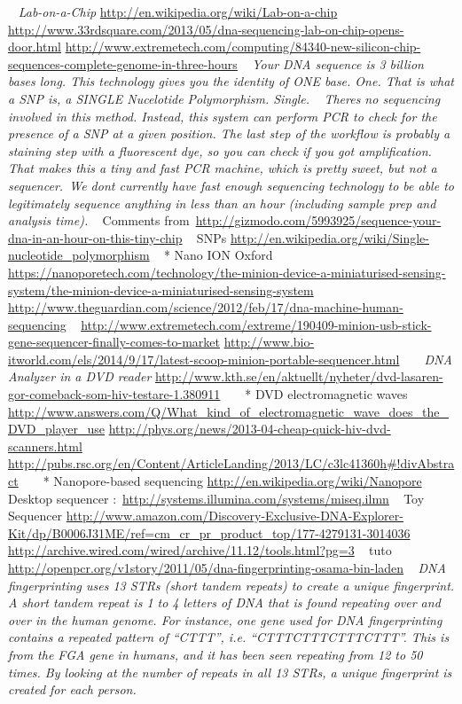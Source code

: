 ~
\textit{Lab-on-a-Chip}
\url{http://en.wikipedia.org/wiki/Lab-on-a-chip}
\url{http://www.33rdsquare.com/2013/05/dna-sequencing-lab-on-chip-opens-door.html}
\url{http://www.extremetech.com/computing/84340-new-silicon-chip-sequences-complete-genome-in-three-hours}
~
\textit{{\textquotedbl}Your DNA sequence is 3 billion bases
long. This technology gives you the identity of ONE base. One. That is
what a SNP is, a SINGLE Nucelotide Polymorphism.
Single.{\textquotedbl}}
~
\textit{{\textquotedbl}There{\textquotesingle}s no sequencing
involved in this method. Instead, this system can perform PCR to check
for the presence of a SNP at a given position. The last step of the
workflow is probably a staining step with a fluorescent dye, so you can
check if you got amplification. That makes this a tiny and fast PCR
machine, which is pretty sweet, but not a sequencer.~We
don{\textquotesingle}t currently have fast enough sequencing technology
to be able to legitimately sequence anything in less than an hour
(including sample prep and analysis time).{\textquotedbl}}
~
Comments
from~\url{http://gizmodo.com/5993925/sequence-your-dna-in-an-hour-on-this-tiny-chip}
~
SNPs
\url{http://en.wikipedia.org/wiki/Single-nucleotide_polymorphism}
~
* Nano ION Oxford
\url{https://nanoporetech.com/technology/the-minion-device-a-miniaturised-sensing-system/the-minion-device-a-miniaturised-sensing-system}
\url{http://www.theguardian.com/science/2012/feb/17/dna-machine-human-sequencing}
~
\url{http://www.extremetech.com/extreme/190409-minion-usb-stick-gene-sequencer-finally-comes-to-market}
\url{http://www.bio-itworld.com/els/2014/9/17/latest-scoop-minion-portable-sequencer.html}
~
~
\textit{DNA Analyzer in a DVD reader}
\url{http://www.kth.se/en/aktuellt/nyheter/dvd-lasaren-gor-comeback-som-hiv-testare-1.380911}
~
~
* DVD electromagnetic waves
\url{http://www.answers.com/Q/What_kind_of_electromagnetic_wave_does_the_DVD_player_use}
\url{http://phys.org/news/2013-04-cheap-quick-hiv-dvd-scanners.html}
\url{http://pubs.rsc.org/en/Content/ArticleLanding/2013/LC/c3lc41360h#!divAbstract}
~
~
* Nanopore-based sequencing
\url{http://en.wikipedia.org/wiki/Nanopore}
~
Desktop sequencer :~\url{http://systems.illumina.com/systems/miseq.ilmn}
~
Toy Sequencer
\url{http://www.amazon.com/Discovery-Exclusive-DNA-Explorer-Kit/dp/B0006J31ME/ref=cm_cr_pr_product_top/177-4279131-3014036}
\url{http://archive.wired.com/wired/archive/11.12/tools.html?pg=3}
~
tuto~
\url{http://openpcr.org/v1story/2011/05/dna-fingerprinting-osama-bin-laden}
~
\textit{{\textquotedbl}DNA fingerprinting uses 13 STRs (short
tandem repeats) to create a unique fingerprint. A short tandem repeat
is 1 to 4 letters of DNA that is found repeating over and over in the
human genome. For instance, one gene used for DNA fingerprinting
contains a repeated pattern of
{\textquotedblleft}CTTT{\textquotedblright}, i.e.
{\textquotedblleft}CTTTCTTTCTTTCTTT{\textquotedblright}. This is from
the FGA gene in humans, and it has been seen repeating from 12 to 50
times. By looking at the number of repeats in all 13 STRs, a unique
fingerprint is created for each person.{\textquotedbl}}
~

